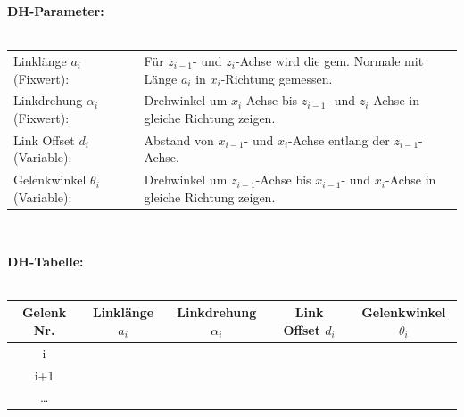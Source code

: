 \begin{minipage}{19cm}
    \textbf{DH-Parameter:}\\ \\
    \begin{tabular}{l l}
        Linklänge $a_i$ (Fixwert): 				& Für $z_{i-1}$- und $z_i$-Achse wird die gem. Normale mit Länge $a_i$ in $x_i$-Richtung gemessen.\\
        Linkdrehung $\alpha_{i}$ (Fixwert):		& Drehwinkel um $x_i$-Achse bis $z_{i-1}$- und $z_i$-Achse in gleiche Richtung zeigen.\\
        Link Offset $d_i$ (Variable):			& Abstand von $x_{i-1}$- und $x_i$-Achse entlang der $z_{i-1}$-Achse.\\
        Gelenkwinkel $\theta_{i}$ (Variable):	& Drehwinkel um $z_{i-1}$-Achse bis $x_{i-1}$- und $x_i$-Achse in gleiche Richtung zeigen.\\
    \end{tabular}
    \vspace{0.5cm}
\end{minipage}\\
\begin{minipage}{19cm}
    \textbf{DH-Tabelle:}\\ \\
    \begin{minipage}{10cm}
        \renewcommand{\arraystretch}{1.1}
        \begin{tabular}{| c | c | c | c | c |}
            \hline
            \textbf{Gelenk Nr.}
            & \textbf{Linklänge $a_i$}
            & \textbf{Linkdrehung $\alpha_{i}$}
            & \textbf{Link Offset $d_i$} 
            & \textbf{Gelenkwinkel $\theta_{i}$}\\
            \hline
            i
            &&&& \\
            \hline
            i+1
            &&&& \\
            \hline
            \ldots
            &&&&\\
            \hline
        \end{tabular}
        \renewcommand{\arraystretch}{1}
        \vspace{0.5cm}
    \end{minipage}
\end{minipage}\\
